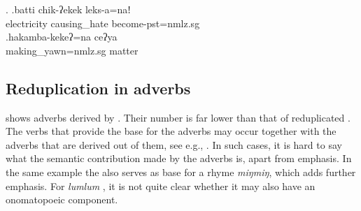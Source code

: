 \ex. \ag.batti chik-ʔekek leks-a=naǃ\\
electricity causing\_hate become{\sc [3sg]-pst=nmlz.sg}\\
\bg.hakamba-kekeʔ=na ceʔya\\
making\_yawn{\sc =nmlz.sg} matter\\

\subsection{Reduplication in adverbs}

 shows adverbs derived by . Their number is far lower than that of reduplicated . The verbs that provide the base for the adverbs may occur together with the adverbs that are derived out of them, see e.g., \Next[a]. In such cases, it is hard to say what the semantic contribution made by the adverbs is, apart from emphasis. In the same example the  also serves as base for a rhyme \emph{miŋmiŋ}, which adds further emphasis. For \emph{lumlum} , it is not quite clear whether it may also have an onomatopoeic component.

\begin{table}
\caption{Adverbs derived by  of verbal roots}\label{adv-red}
\end{table}



